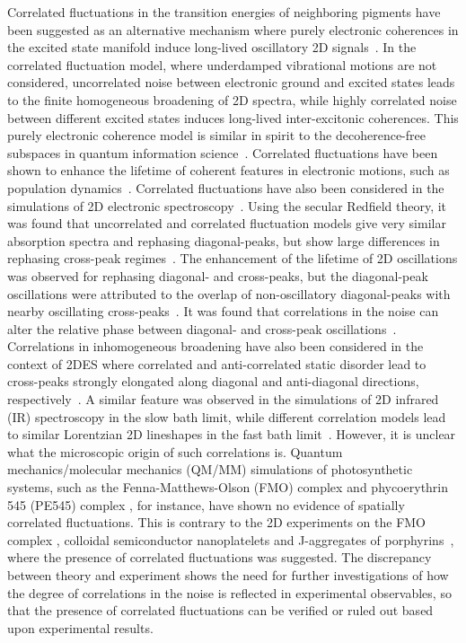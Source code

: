 \documentclass[%
 reprint,%
 amssymb, amsmath,%
 aip,cha,%
]{revtex4-1}
\begin{document}
Correlated fluctuations in the transition energies of neighboring pigments have been suggested as an alternative mechanism where purely electronic coherences in the excited state manifold induce long-lived oscillatory 2D signals~\cite{LeeScience2007,IshizakiPCCP2010,JeskeJCP2015}. In the correlated fluctuation model, where underdamped vibrational motions are not considered, uncorrelated noise between electronic ground and excited states leads to the finite homogeneous broadening of 2D spectra, while highly correlated noise between different excited states induces long-lived inter-excitonic coherences. This purely electronic coherence model is similar in spirit to the decoherence-free subspaces in quantum information science~\cite{LidarPRL1998,JeskePRA2013_2}. Correlated fluctuations have been shown to enhance the lifetime of coherent features in electronic motions, such as population dynamics~\cite{NalbachNJP2010,IshizakiNJP2010,ChenJCP2010,McCutcheonPRB2011,LimNJP2014,JeskeJCP2015}. Correlated fluctuations have also been considered in the simulations of 2D electronic spectroscopy~\cite{AbramaviciusJCP2011,SeibtJCP2014}. Using the secular Redfield theory, it was found that uncorrelated and correlated fluctuation models give very similar absorption spectra and rephasing diagonal-peaks, but show large differences in rephasing cross-peak regimes~\cite{AbramaviciusJCP2011}. The enhancement of the lifetime of 2D oscillations was observed for rephasing diagonal- and cross-peaks, but the diagonal-peak oscillations were attributed to the overlap of non-oscillatory diagonal-peaks with nearby oscillating cross-peaks~\cite{AbramaviciusJCP2011}. It was found that correlations in the noise can alter the relative phase between diagonal- and cross-peak oscillations~\cite{SeibtJCP2014}. Correlations in inhomogeneous broadening have also been considered in the context of 2DES where correlated and anti-correlated static disorder lead to cross-peaks strongly elongated along diagonal and anti-diagonal directions, respectively~\cite{RancovaJCP2015}. A similar feature was observed in the simulations of 2D infrared (IR) spectroscopy in the slow bath limit, while different correlation models lead to similar Lorentzian 2D lineshapes in the fast bath limit~\cite{VenkatramaniJCP2002}. However, it is unclear what the microscopic origin of such correlations is.  Quantum mechanics/molecular mechanics (QM/MM) simulations of photosynthetic systems, such as the Fenna-Matthews-Olson (FMO) complex \cite{OlbrichJPCB2011,ShimBJ2012} and phycoerythrin 545 (PE545) complex \cite{VianiJPCL2013}, for instance, have shown no evidence of spatially correlated fluctuations.  This is contrary to the 2D experiments on the FMO complex \cite{CaramJCP2012,FidlerJPCA2012}, colloidal semiconductor nanoplatelets \cite{CassetteNC2015} and J-aggregates of porphyrins~\cite{BolzonelloJPCL2016}, where the presence of correlated fluctuations was suggested.  The discrepancy between theory and experiment shows the need for further investigations of how the degree of correlations in the noise is reflected in experimental observables, so that the presence of correlated fluctuations can be verified or ruled out based upon experimental results.
\end{document}
